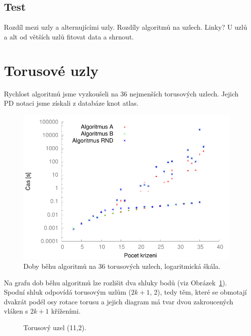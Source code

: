 \subsection{Test}
Rozdíl mezi uzly a alternujícími uzly.
Rozdíly algoritmů na uzlech.
Linky?
U uzlů a alt od větších uzlů fitovat data a shrnout.

\section{Torusové uzly}
Rychlost algoritmů jsme vyzkoušeli na 36 nejmenších torusových uzlech. Jejich PD notaci jsme získali z databáze knot atlas.

\begin{figure}[p]\centering
\includegraphics{../img/torusSrov}
\caption{Doby běhu algoritmů na 36 torusových uzlech, logaritmická škála.}
\label{obr03:torusSrov}
\end{figure}

Na grafu dob běhu algoritmů lze rozlišit dva shluky bodů (viz Obrázek~\ref{obr03:torusSrov}). Spodní shluk odpovídá torusovým uzlům ($2k+1$, 2), tedy těm, které se obmotají dvakrát podél osy rotace torusu a jejich diagram má tvar dvou zakroucených vláken s $2k+1$ kříženími.

\begin{figure}[h]\centering
{}
\caption{Torusový uzel (11,2).}
\label{obr04:torus11}
\end{figure}

